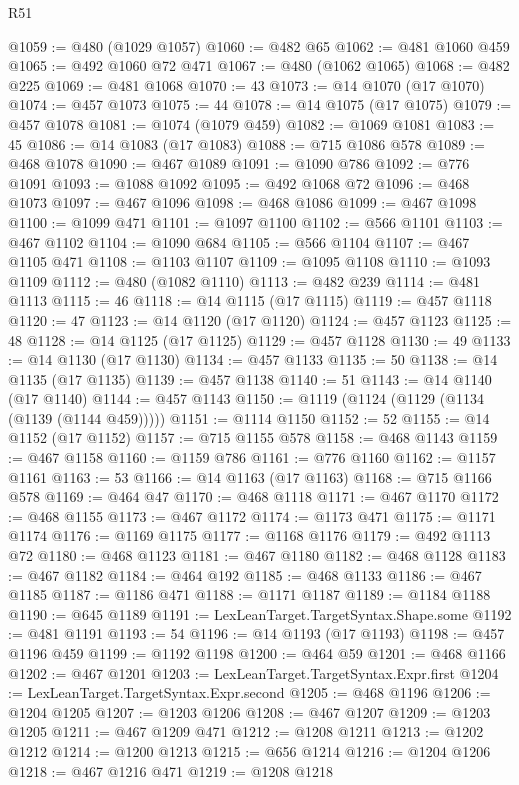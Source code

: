 \begin{lexlean}{R51}
\begin{coremodule}
@1059 := @480 (@1029 @1057)
@1060 := @482 @65
@1062 := @481 @1060 @459
@1065 := @492 @1060 @72 @471
@1067 := @480 (@1062 @1065)
@1068 := @482 @225
@1069 := @481 @1068
@1070 := 43
@1073 := @14 @1070 (@17 @1070)
@1074 := @457 @1073
@1075 := 44
@1078 := @14 @1075 (@17 @1075)
@1079 := @457 @1078
@1081 := @1074 (@1079 @459)
@1082 := @1069 @1081
@1083 := 45
@1086 := @14 @1083 (@17 @1083)
@1088 := @715 @1086 @578
@1089 := @468 @1078
@1090 := @467 @1089
@1091 := @1090 @786
@1092 := @776 @1091
@1093 := @1088 @1092
@1095 := @492 @1068 @72
@1096 := @468 @1073
@1097 := @467 @1096
@1098 := @468 @1086
@1099 := @467 @1098
@1100 := @1099 @471
@1101 := @1097 @1100
@1102 := @566 @1101
@1103 := @467 @1102
@1104 := @1090 @684
@1105 := @566 @1104
@1107 := @467 @1105 @471
@1108 := @1103 @1107
@1109 := @1095 @1108
@1110 := @1093 @1109
@1112 := @480 (@1082 @1110)
@1113 := @482 @239
@1114 := @481 @1113
@1115 := 46
@1118 := @14 @1115 (@17 @1115)
@1119 := @457 @1118
@1120 := 47
@1123 := @14 @1120 (@17 @1120)
@1124 := @457 @1123
@1125 := 48
@1128 := @14 @1125 (@17 @1125)
@1129 := @457 @1128
@1130 := 49
@1133 := @14 @1130 (@17 @1130)
@1134 := @457 @1133
@1135 := 50
@1138 := @14 @1135 (@17 @1135)
@1139 := @457 @1138
@1140 := 51
@1143 := @14 @1140 (@17 @1140)
@1144 := @457 @1143
@1150 := @1119 (@1124 (@1129 (@1134 (@1139 (@1144 @459)))))
@1151 := @1114 @1150
@1152 := 52
@1155 := @14 @1152 (@17 @1152)
@1157 := @715 @1155 @578
@1158 := @468 @1143
@1159 := @467 @1158
@1160 := @1159 @786
@1161 := @776 @1160
@1162 := @1157 @1161
@1163 := 53
@1166 := @14 @1163 (@17 @1163)
@1168 := @715 @1166 @578
@1169 := @464 @47
@1170 := @468 @1118
@1171 := @467 @1170
@1172 := @468 @1155
@1173 := @467 @1172
@1174 := @1173 @471
@1175 := @1171 @1174
@1176 := @1169 @1175
@1177 := @1168 @1176
@1179 := @492 @1113 @72
@1180 := @468 @1123
@1181 := @467 @1180
@1182 := @468 @1128
@1183 := @467 @1182
@1184 := @464 @192
@1185 := @468 @1133
@1186 := @467 @1185
@1187 := @1186 @471
@1188 := @1171 @1187
@1189 := @1184 @1188
@1190 := @645 @1189
@1191 := LexLeanTarget.TargetSyntax.Shape.some
@1192 := @481 @1191
@1193 := 54
@1196 := @14 @1193 (@17 @1193)
@1198 := @457 @1196 @459
@1199 := @1192 @1198
@1200 := @464 @59
@1201 := @468 @1166
@1202 := @467 @1201
@1203 := LexLeanTarget.TargetSyntax.Expr.first
@1204 := LexLeanTarget.TargetSyntax.Expr.second
@1205 := @468 @1196
@1206 := @1204 @1205
@1207 := @1203 @1206
@1208 := @467 @1207
@1209 := @1203 @1205
@1211 := @467 @1209 @471
@1212 := @1208 @1211
@1213 := @1202 @1212
@1214 := @1200 @1213
@1215 := @656 @1214
@1216 := @1204 @1206
@1218 := @467 @1216 @471
@1219 := @1208 @1218

\end{coremodule}
\end{lexlean}
